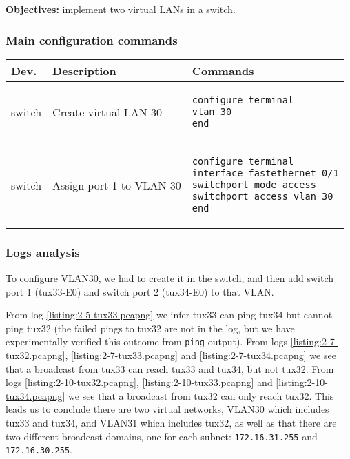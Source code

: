 \documentclass[a4paper, 11pt]{report}
\begin{document}
\noindent
\textbf{Objectives:} implement two virtual LANs in a switch.

\subsubsection{Main configuration commands} \label{sec:Com2}

\begin{tabular}{l | p{75mm} | l}
    \textbf{Dev.} & \textbf{Description}                                  & \textbf{Commands}                       \\ \hline
    switch        & Create virtual LAN 30                                 &
        \begin{lstlisting}[frame=none, numbers=none, language=sh]
configure terminal
vlan 30
end
        \end{lstlisting} \\
    switch        & Assign port 1 to VLAN 30                              & 
        \begin{lstlisting}[frame=none, numbers=none, language=sh]
configure terminal
interface fastethernet 0/1
switchport mode access
switchport access vlan 30
end
        \end{lstlisting} \\
\end{tabular}

\subsubsection{Logs analysis} \label{sec:Log2}

To configure VLAN30, we had to create it in the switch, and then add switch port 1 (tux33-E0) and switch port 2 (tux34-E0) to that VLAN.

From log \ref{listing:2-5-tux33.pcapng} we infer tux33 can ping tux34 but cannot ping tux32 (the failed pings to tux32 are not in the log, but we have experimentally verified this outcome from \texttt{ping} output).
From logs \ref{listing:2-7-tux32.pcapng}, \ref{listing:2-7-tux33.pcapng} and \ref{listing:2-7-tux34.pcapng} we see that a broadcast from tux33 can reach tux33 and tux34, but not tux32.
From logs \ref{listing:2-10-tux32.pcapng}, \ref{listing:2-10-tux33.pcapng} and \ref{listing:2-10-tux34.pcapng} we see that a broadcast from tux32 can only reach tux32.
This leads us to conclude there are two virtual networks, VLAN30 which includes tux33 and tux34, and VLAN31 which includes tux32, as well as that there are two different broadcast domains, one for each subnet: \texttt{172.16.31.255} and \texttt{172.16.30.255}.
\end{document}
